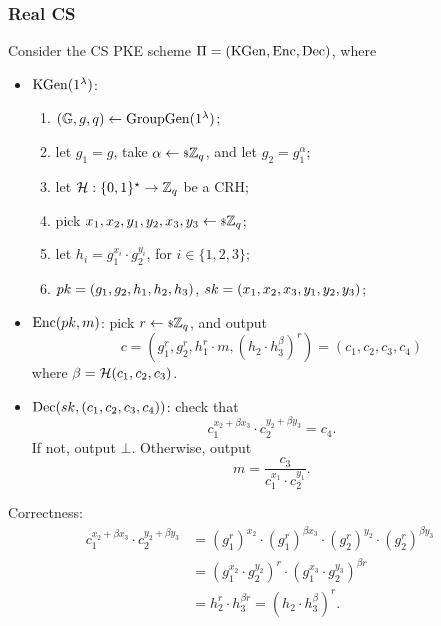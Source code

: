 \subsubsection{Real \acl{CS}}

\begin{construction}[\acl{CS}] \label{cons:cs}
	Consider the \ac{CS} \ac{PKE} scheme $\Pi = (\mathrm{KGen}, \mathrm{Enc}, \mathrm{Dec})$, where
	\begin{itemize}
		\item $\mathrm{KGen}(1^{\lambda})$:
			\begin{enumerate}
				\item $(\mathbb{G} , \allowbreak g , \allowbreak q) \leftarrow \mathrm{GroupGen}(1^{\lambda})$;
				\item let $g_1 = g$, take $\alpha \leftarrow {\scriptstyle \$} {\mathbb{Z}_q}$, and let $g_2 = g_1^{\alpha}$;
				\item let $\mathcal{H} : \{0,1\}^{\star} \to \mathbb{Z}_q$ be a \ac{CRH};
				\item pick $x_1, x_2, y_1, y_2, x_3, y_3 \leftarrow {\scriptstyle \$} {\mathbb{Z}_q}$;
				\item let $h_i = g_1^{x_i} \cdot g_2^{y_i}$, for $i \in \{1,2,3\}$;
				\item $pk = (g_1, g_2, h_1, h_2, h_3)$, $sk = (x_1, x_2, x_3, y_1, y_2, y_3)$;
			\end{enumerate}
		\item $\mathrm{Enc}(pk, m)$:
			pick $r \leftarrow {\scriptstyle \$} {\mathbb{Z}_q}$, and output
			\begin{equation*}
				c = \left( g_1^{r}, g_2^{r}, h_1^{r} \cdot m, \left(h_2 \cdot h_3^{\beta}\right)^{r} \right) = (c_1, c_2, c_3, c_4)
			\end{equation*}
			where $\beta = \mathcal{H}(c_1, c_2, c_3)$.
		\item $\mathrm{Dec}(sk, (c_1, c_2, c_3, c_4))$:
			check that
			\begin{equation*}
				c_1^{x_2 + \beta x_3} \cdot c_2^{y_2 + \beta y_3} = c_4.
			\end{equation*}
			If not, output $\bot$.
			Otherwise, output
			\begin{equation*}
				m = \frac{c_3}{c_1^{x_1} \cdot c_2^{y_1}}.
			\end{equation*}
	\end{itemize}
	Correctness:
	\begin{align*}
		c_1^{x_2 + \beta x_3} \cdot c_2^{y_2 + \beta y_3}
		& =
		\left( g_1^r \right)^{x_2} \cdot
		\left( g_1^r \right)^{\beta x_3} \cdot
		\left( g_2^r \right)^{y_2} \cdot
		\left( g_2^r \right)^{\beta y_3} \\
		& = 
		\left( g_1^{x_2} \cdot g_2^{y_2} \right)^{r} \cdot
		\left( g_1^{x_3} \cdot g_2^{y_3} \right)^{\beta r} \\
		& = h_2^{r} \cdot h_3^{\beta r}
		=
		\left( h_2 \cdot h_3^{\beta} \right)^{r}.
	\end{align*}
\end{construction}

